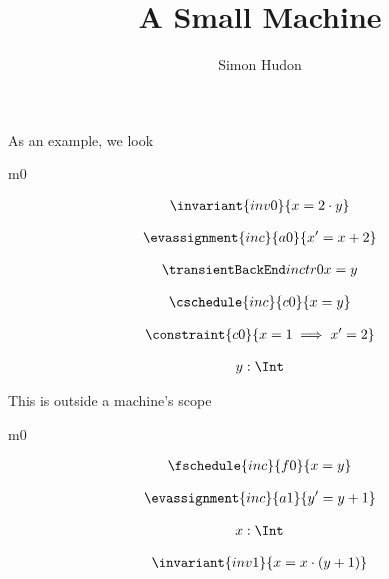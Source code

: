 \documentclass[12pt]{amsart}
\title{A Small Machine}
\author{Simon Hudon}
\date{} %
\begin{document}
\maketitle

As an example, we look

\begin{machine}{m0}


\begin{align*}
\invariant{inv0}
{	x = 2 \cdot y	}
\end{align*}

\begin{align*}
\evassignment{inc}{a0}
{	x' = x + 2	}
\end{align*}

\begin{align*}
\transient{inc}{tr0}
{	x = y	}
\end{align*}

\begin{align*}
\cschedule{inc}{c0}
{	x = y	}
\end{align*}

\begin{align*}
\constraint{c0}
{	x = 1 \implies x' = 2	}
\end{align*}

\begin{align*}
\variable{	y: \Int}
\end{align*}

\end{machine}
This is outside a machine's scope

\begin{machine}{m0}

\begin{align*}
\fschedule{inc}{f0}
{	x = y	}
\end{align*}

\begin{align*}
\evassignment{inc}{a1}
{	y' = y + 1	}
\end{align*}

\begin{align*}
\variable{	x: \Int}
\end{align*}

\begin{align*}
\invariant{inv1}
{	x = x \cdot (y + 1)	}
\end{align*}


\end{machine}
\end{document}
